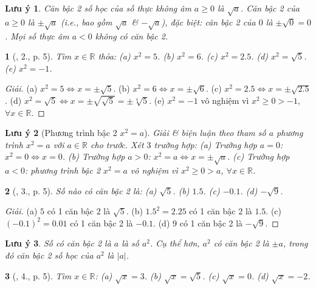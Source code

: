 \documentclass{article}
\newtheorem{baitoan}{}%
\newtheorem{luuy}{Lưu ý}
\begin{document}
\begin{luuy}
	Căn bậc 2 số học của số thực không âm $a\ge0$ là $\sqrt{a}$. Căn bậc 2 của $a\ge0$ là $\pm\sqrt{a}$ (i.e., bao gồm $\sqrt{a}$ \& $-\sqrt{a}$), đặc biệt: căn bậc 2 của $0$ là $\pm\sqrt{0} = 0$. Mọi số thực âm $a < 0$ không có căn bậc 2. 
\end{luuy}

\begin{baitoan}[\cite{SBT_Toan_9_tap_1}, 2., p. 5]
	Tìm $x\in\mathbb{R}$ thỏa: (a) $x^2 = 5$. (b) $x^2 = 6$. (c) $x^2 = 2.5$. (d) $x^2 = \sqrt{5}$. (e) $x^2 = -1$.
\end{baitoan}

\begin{proof}[Giải]
	(a) $x^2 = 5\Leftrightarrow x = \pm\sqrt{5}$. (b) $x^2 = 6\Leftrightarrow x = \pm\sqrt{6}$. (c) $x^2 = 2.5\Leftrightarrow x = \pm\sqrt{2.5}$. (d) $x^2 = \sqrt{5}\Leftrightarrow x = \pm\sqrt{\sqrt{5}} = \pm\sqrt[4]{5}$. (e) $x^2 = -1$ vô nghiệm vì $x^2\ge0 > -1$, $\forall x\in\mathbb{R}$.
\end{proof}

\begin{luuy}[Phương trình bậc 2 $x^2 = a$]
	Giải \& biện luận theo tham số $a$ phương trình $x^2 = a$ với $a\in\mathbb{R}$ cho trước. Xét $3$ trường hợp: (a) Trường hợp $a = 0$: $x^2 = 0\Leftrightarrow x = 0$. (b) Trường hợp $a > 0$: $x^2 = a\Leftrightarrow x = \pm\sqrt{a}$. (c) Trường hợp $a < 0$: phương trình bậc 2 $x^2 = a$ vô nghiệm vì $x^2\ge0 > a$, $\forall x\in\mathbb{R}$.
\end{luuy}

\begin{baitoan}[\cite{SBT_Toan_9_tap_1}, 3., p. 5]
	Số nào có căn bậc 2 là: (a) $\sqrt{5}$. (b) $1.5$. (c) $-0.1$. (d) $-\sqrt{9}$.
\end{baitoan}

\begin{proof}[Giải]
	(a) $5$ có 1 căn bậc 2 là $\sqrt{5}$. (b) $1.5^2 = 2.25$ có 1 căn bậc 2 là $1.5$. (c) $(-0.1)^2 = 0.01$ có 1 căn bậc 2 là $-0.1$. (d) $9$ có 1 căn bậc 2 là $-\sqrt{9}$.
\end{proof}

\begin{luuy}
	Số có căn bậc 2 là $a$ là số $a^2$. Cụ thể hơn, $a^2$ có căn bậc 2 là $\pm a$, trong đó căn bậc 2 số học của $a^2$ là $|a|$.
\end{luuy}

\begin{baitoan}[\cite{SBT_Toan_9_tap_1}, 4., p. 5]
	Tìm $x\in\mathbb{R}$: (a) $\sqrt{x} = 3$. (b) $\sqrt{x} = \sqrt{5}$. (c) $\sqrt{x} = 0$. (d) $\sqrt{x} = -2$.
\end{baitoan}
\end{document}
